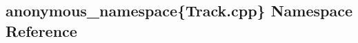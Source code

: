 \hypertarget{namespaceanonymous__namespace_02Track_8cpp_03}{\subsection{anonymous\-\_\-namespace\{Track.\-cpp\} Namespace Reference}
\label{namespaceanonymous__namespace_02Track_8cpp_03}
}
